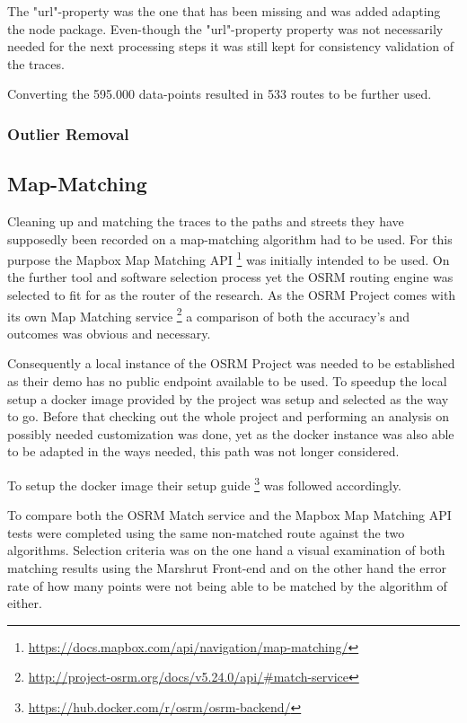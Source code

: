 The "url"-property was the one that has been missing and was added adapting the node package. Even-though the "url"-property property was not necessarily needed for the next processing steps it was still kept for consistency validation of the traces.

Converting the 595.000 data-points resulted in 533 routes to be further used.





\subsubsection{Outlier Removal}



\subsection{Map-Matching}

Cleaning up and matching the traces to the paths and streets they have supposedly been recorded on a map-matching algorithm had to be used. For this purpose the Mapbox Map Matching API \footnote{\url{https://docs.mapbox.com/api/navigation/map-matching/}} was initially intended to be used. On the further tool and software selection process yet the OSRM routing engine was selected to fit for as the router of the research. As the OSRM Project comes with its own Map Matching service \footnote{\url{http://project-osrm.org/docs/v5.24.0/api/#match-service}} a comparison of both the accuracy's and outcomes was obvious and necessary.

Consequently a local instance of the OSRM Project was needed to be established as their demo has no public endpoint available to be used. To speedup the local setup a docker image provided by the project was setup and selected as the way to go. Before that checking out the whole project and performing an analysis on possibly needed customization was done, yet as the docker instance was also able to be adapted in the ways needed, this path was not longer considered.

To setup the docker image their setup guide \footnote{\url{https://hub.docker.com/r/osrm/osrm-backend/}} was followed accordingly.

To compare both the OSRM Match service and the Mapbox Map Matching API tests were completed using the same non-matched route against the two algorithms. Selection criteria was on the one hand a visual examination of both matching results using the Marshrut Front-end and on the other hand the error rate of how many points were not being able to be matched by the algorithm of either. 

